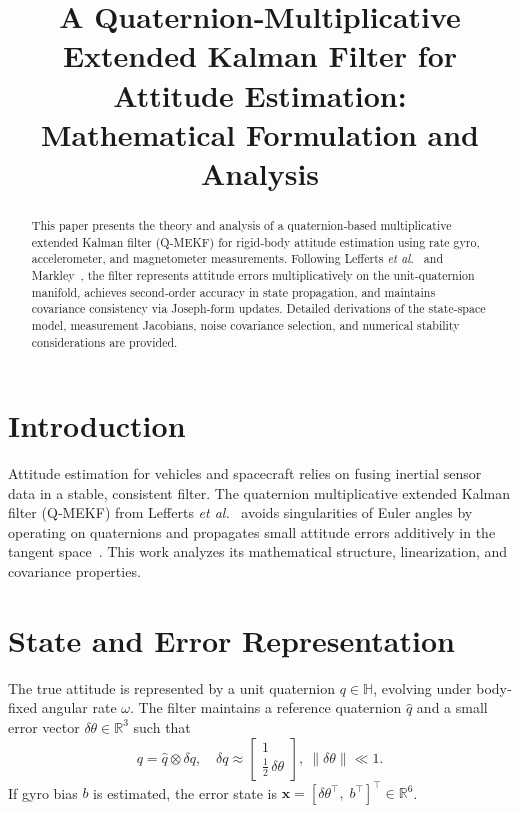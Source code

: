 \documentclass[12pt]{article}
\title{A Quaternion‐Multiplicative Extended Kalman Filter for Attitude Estimation:\\
Mathematical Formulation and Analysis}
\author{}
\date{}
\begin{document}
\maketitle

\begin{abstract}
This paper presents the theory and analysis of a quaternion‐based multiplicative extended Kalman filter (Q‐MEKF) for rigid‐body attitude estimation using rate gyro, accelerometer, and magnetometer measurements.  Following Lefferts \emph{et al.}~\cite{Lefferts1982} and Markley~\cite{Markley2003}, the filter represents attitude errors multiplicatively on the unit‐quaternion manifold, achieves second‐order accuracy in state propagation, and maintains covariance consistency via Joseph‐form updates.  Detailed derivations of the state‐space model, measurement Jacobians, noise covariance selection, and numerical stability considerations are provided.
\end{abstract}

\section{Introduction}
Attitude estimation for vehicles and spacecraft relies on fusing inertial sensor data in a stable, consistent filter.  The quaternion multiplicative extended Kalman filter (Q‐MEKF) from Lefferts \emph{et al.}~\cite{Lefferts1982} avoids singularities of Euler angles by operating on quaternions and propagates small attitude errors additively in the tangent space~\cite{Markley2003}.  This work analyzes its mathematical structure, linearization, and covariance properties.

\section{State and Error Representation}
The true attitude is represented by a unit quaternion \(q\in\mathbb{H}\), evolving under body‐fixed angular rate \(\omega\).  The filter maintains a reference quaternion \(\hat q\) and a small error vector \(\delta\theta\in\mathbb{R}^3\) such that
\[
q = \hat q \otimes \delta q,\quad
\delta q \approx \begin{bmatrix}1\\\tfrac12\,\delta\theta\end{bmatrix},\ \|\delta\theta\|\ll1.
\]
If gyro bias \(b\) is estimated, the error state is \(\mathbf{x}=[\delta\theta^\top,\;b^\top]^\top\in\mathbb{R}^6\).
\end{document}
